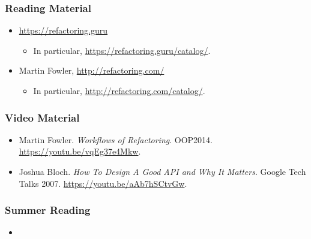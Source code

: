 \begin{frame}

\frametitle{Reading Material}

\footnotesize

\begin{itemize}

\item \url{https://refactoring.guru}

\begin{itemize}

\item In particular, \url{https://refactoring.guru/catalog/}.

\end{itemize}

\item Martin Fowler, \url{http://refactoring.com/}

\begin{itemize}

\item In particular, \url{http://refactoring.com/catalog/}.

\end{itemize}

\end{itemize}

\end{frame}


\begin{frame}

\frametitle{Video Material}

\footnotesize

\begin{itemize}

\item Martin Fowler. \emph{Workflows of Refactoring}. OOP2014.
\url{https://youtu.be/vqEg37e4Mkw}.

\item Joshua Bloch. \emph{How To Design A Good API and Why It Matters}. Google
Tech Talks 2007. \url{https://youtu.be/aAb7hSCtvGw}.

%

\end{itemize}

\end{frame}


\begin{frame}

\frametitle{Summer Reading}

\footnotesize

\begin{itemize}

\item

\end{itemize}

\end{frame}
